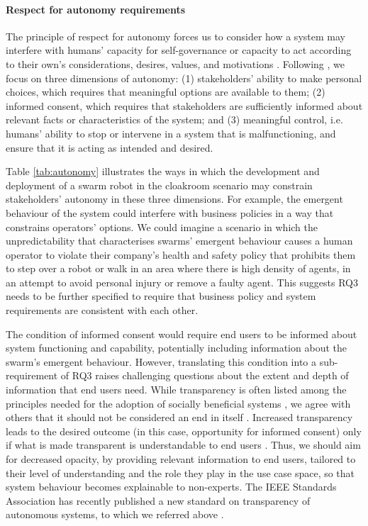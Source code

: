 \documentclass[lettersize,journal]{IEEEtran}
\begin{document}
\paragraph{Respect for autonomy requirements}
The principle of respect for autonomy forces us to consider how a system may interfere with humans’ capacity for self-governance or capacity to act according to their own’s considerations, desires, values, and motivations \cite{beauchamp2019principles}. Following \cite{Porter2022}, we focus on three dimensions of autonomy: (1) stakeholders’ ability to make personal choices, which requires that meaningful options are available to them; (2) informed consent, which requires that stakeholders are sufficiently informed about relevant facts or characteristics of the system; and (3) meaningful control, i.e. humans’ ability to stop or intervene in a system that is malfunctioning, and ensure that it is acting as intended and desired.

Table \ref{tab:autonomy} illustrates the ways in which the development and deployment of a swarm robot in the cloakroom scenario may constrain stakeholders’ autonomy in these three dimensions. For example, the emergent behaviour of the system could interfere with business policies in a way that constrains operators’ options. We could imagine a scenario in which the unpredictability that characterises swarms’ emergent behaviour causes a human operator to violate their company’s health and safety policy that prohibits them to step over a robot or walk in an area where there is high density of agents, in an attempt to avoid personal injury or remove a faulty agent. This suggests RQ3 needs to be further specified to require that business policy and system requirements are consistent with each other.

The condition of informed consent would require end users to be informed about system functioning and capability, potentially including information about the swarm’s emergent behaviour. However, translating this condition into a sub-requirement of RQ3 raises challenging questions about the extent and depth of information that end users need. While transparency is often listed among the principles needed for the adoption of socially beneficial systems \cite{IEEEAligned}, we agree with others that it should not be considered an end in itself \cite{Porter2022}. Increased transparency leads to the desired outcome (in this case, opportunity for informed consent) only if what is made transparent is understandable to end users \cite{ananny2018seeing}. Thus, we should aim for decreased opacity, by providing relevant information to end users, tailored to their level of understanding and the role they play in the use case space, so that system behaviour becomes explainable to non-experts. The IEEE Standards Association has recently published a new standard on transparency of autonomous systems, to which we referred above \cite{IEEETransparency}.
\end{document}
